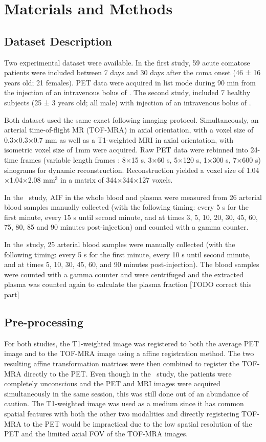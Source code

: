 \chapter{Materials and Methods}

\section{Dataset Description}
Two experimental dataset were available.
In the first study, 59 acute comatose patients were included between 7 days and 30 days after the coma onset (46 ± 16 years old; 21 females).
PET data were acquired in list mode during 90 min from the injection of an intravenous bolus of \fdg.
The second study, included 7 healthy subjects (25 ± 3 years old; all male) with injection of an intravenous bolus of \yohimbine.

Both dataset used the same exact following imaging protocol.
Simultaneously, an arterial time-of-flight MR (TOF-MRA)  in axial orientation, with a voxel size of 0.3$\times$0.3$\times$0.7 mm as well as a T1-weighted MRI in axial orientation, with isometric voxel size of 1mm were acquired.
Raw PET data were rebinned into 24-time frames (variable length frames : 8$\times$15 s, 3$\times$60 s, 5$\times$120 s, 1$\times$300 s, 7$\times$600 s) sinograms for dynamic reconstruction.
Reconstruction yielded a voxel size of 1.04$\times$1.04$\times$2.08 mm$^3$ in a matrix of 344$\times$344$\times$127 voxels.

In the \fdg  $\,$ study, AIF in the whole blood and plasma were measured from 26 arterial blood samples manually collected (with the following timing: every 5 s for the first minute, every 15 s until second minute, and at times 3, 5, 10, 20, 30, 45, 60, 75, 80, 85 and 90 minutes post-injection) and counted with a gamma counter.

In the \yohimbine $\,$study, 25 arterial blood samples were manually collected (with the following timing: every 5 s for the first minute, every 10 s until second minute, and at times 5, 10, 30, 45, 60, and 90 minutes post-injection).
The blood samples were counted with a gamma counter and were centrifuged and the extracted plasma was counted again to calculate the plasma fraction [TODO correct this part]


\section{Pre-processing}
For both studies, the T1-weighted image was registered to both the average PET image and to the TOF-MRA image using a affine registration method.
The two resulting affine transformation matrices were then combined to register the TOF-MRA directly to the PET.
Even though in the \fdg $\,$ study, the patients were completely unconscious and the PET and MRI images were acquired simultaneously in the same session, this was still done out of an abundance of caution.
The T1-weighted image was used as a medium since it has common spatial features with both the other two modalities and directly registering TOF-MRA to the PET would be impractical due to the low spatial resolution of the PET and the limited axial FOV of the TOF-MRA images.

